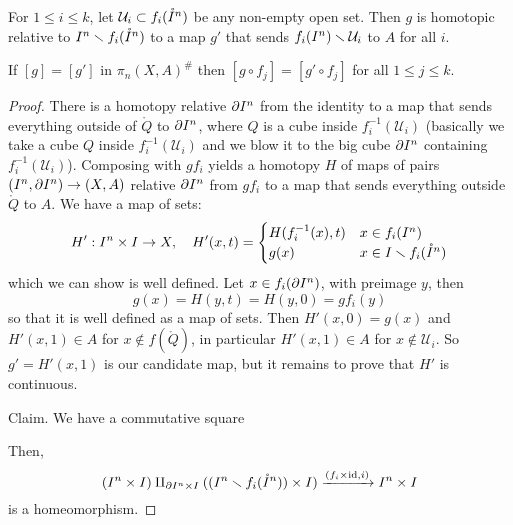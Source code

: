 \begin{lemma}\label{lemma:technical-lemma-for-HAT}
For $1\leq i\leq k$, let $\mathcal{U}_i\subset f_i(\mathring I^n)$ be any non-empty open set. Then $g$ is homotopic relative to $I^n\smallsetminus f_i(\mathring{I}^n)$ to a map $g'$ that sends $f_i(I^n)\smallsetminus\mathcal{U}_i$ to $A$ for all $i$.\alvaropls{}
\end{lemma}

\begin{remark}
If $[g]=[g']$ in $\pi_n(X,A)^\#$ then $[g\circ f_j]=[g'\circ f_j]$ for all $1\leq j\leq k$.
\end{remark}

\begin{proof}
There is a homotopy relative $\partial I^n$ from the identity to a map that sends everything outside of $\ring Q$ to $\partial I^n$, where $Q$ is a cube inside $f^{-1}_i(\mathcal{U}_i)$ (basically we take a cube $Q$ inside $f^{-1}_i(\mathcal{U}_i)$ and we blow it to the big cube $\partial I^n$ containing $f^{-1}_i(\mathcal{U}_i)$). Composing with $gf_i$ yields a homotopy $H$ of maps of pairs $(I^n,\partial I^n)\to(X,A)$ relative $\partial I^n$ from $gf_i$ to a map that sends everything outside $\ring Q$ to $A$. We have a map of sets:
\[H':I^n\times I\to X,\quad H'(x,t)=\begin{cases}H(f_i^{-1}(x),t) & x\in f_i(I^n) \\ g(x) & x\in I\smallsetminus f_i(\mathring{I}^n)\end{cases}\]
which we can show is well defined. Let $x\in f_i(\partial I^n)$, with preimage $y$, then
\[g(x)=H(y,t)=H(y,0)=gf_i(y)\] so that it is well defined as a map of sets. Then $H'(x,0)=g(x)$ and $H'(x,1)\in A$ for $x\not\in f(\mathring{Q})$, in particular $H'(x,1)\in A$ for $x\not\in\mathcal{U}_i$. So $g'=H'(x,1)$ is our candidate map, but it remains to prove that $H'$ is continuous.

Claim. We have a commutative square
\begin{center}
\end{center}
Then,
\[(I^n\times I)\amalg_{\partial I^n\times I} ((I^n\smallsetminus f_i(\mathring{I}^n))\times I)\xrightarrow{(f_i\times\operatorname{id},i)} I^n\times I\]
is a homeomorphism.


\end{proof}
